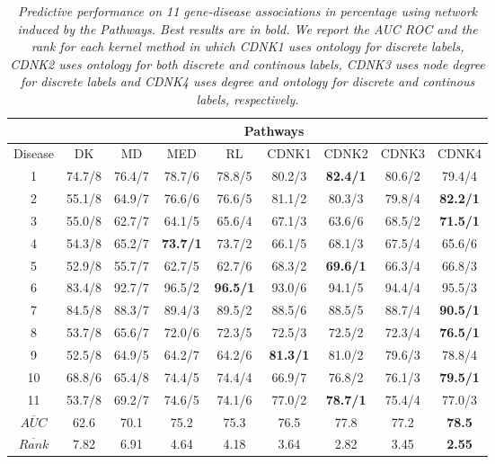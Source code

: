 \documentclass[review]{elsarticle}
\begin{document}
\begin{table}
\centering
\setlength{\tabcolsep}{1mm}
\begin{tabular}{|c|c|c|c|c|c|c|c|c|}
\hline
         & \multicolumn{8}{c|}{\textbf{Pathways}} \\
 \hline
Disease & DK & MD & MED & RL & CDNK1 & CDNK2 & CDNK3 & CDNK4 \\

 \hline
1 & 74.7/8 & 76.4/7 & 78.7/6 & 78.8/5 & 80.2/3 & \textbf{82.4/1} & 80.6/2 & 79.4/4 \\
2 & 55.1/8 & 64.9/7 & 76.6/6 & 76.6/5 & 81.1/2 & 80.3/3 & 79.8/4 & \textbf{82.2/1} \\
3 & 55.0/8 & 62.7/7 & 64.1/5 & 65.6/4 & 67.1/3 & 63.6/6 & 68.5/2 & \textbf{71.5/1} \\
4 & 54.3/8 & 65.2/7 & \textbf{73.7/1} & 73.7/2 & 66.1/5 & 68.1/3 & 67.5/4 & 65.6/6 \\
5 & 52.9/8 & 55.7/7 & 62.7/5 & 62.7/6 & 68.3/2 & \textbf{69.6/1} & 66.3/4 & 66.8/3 \\
6 & 83.4/8 & 92.7/7 & 96.5/2 & \textbf{96.5/1} & 93.0/6 & 94.1/5 & 94.4/4 & 95.5/3 \\
7 & 84.5/8 & 88.3/7 & 89.4/3 & 89.5/2 & 88.5/6 & 88.5/5 & 88.7/4 & \textbf{90.5/1} \\
8 & 53.7/8 & 65.6/7 & 72.0/6 & 72.3/5 & 72.5/3 & 72.5/2 & 72.3/4 & \textbf{76.5/1} \\
9 & 52.5/8 & 64.9/5 & 64.2/7 & 64.2/6 & \textbf{81.3/1} & 81.0/2 & 79.6/3 & 78.8/4 \\
10 & 68.8/6 & 65.4/8 & 74.4/5 & 74.4/4 & 66.9/7 & 76.8/2 & 76.1/3 & \textbf{79.5/1} \\
11 & 53.7/8 & 69.2/7 & 74.6/5 & 74.1/6 & 77.0/2 & \textbf{78.7/1} & 75.4/4 & 77.0/3 \\
\hline
$\overline{AUC}$ & 62.6 & 70.1 & 75.2 & 75.3 & 76.5 & 77.8 & 77.2 & \textbf{78.5} \\
$\overline{Rank}$ & 7.82 & 6.91 & 4.64 & 4.18 & 3.64 & 2.82 & 3.45 & \textbf{2.55} \\
 \hline 
\end{tabular}
\caption{\textit {Predictive performance on 11 gene-disease associations in percentage using network induced by the Pathways. Best results are in bold. We report the AUC ROC and the rank for each kernel method in which CDNK1 uses ontology for discrete labels, CDNK2 uses ontology for both discrete and continous labels, CDNK3 uses node degree for discrete labels and CDNK4 uses degree and ontology for discrete and continous labels, respectively.}}
\label{table_pathways}
\end{table}
\end{document}

